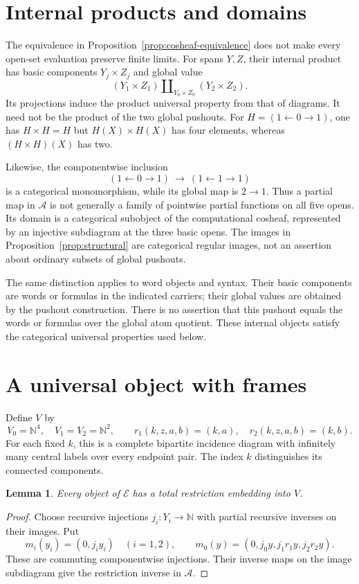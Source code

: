 \documentclass[11pt]{article}
\newtheorem{lemma}[theorem]{Lemma}
\newcommand{\N}{\mathbb N}
\newcommand{\E}{\mathscr E}
\newcommand{\A}{\mathscr A}
\begin{document}
\section{Internal products and domains}\label{sec:internal}

The equivalence in Proposition~\ref{prop:cosheaf-equivalence}
does not make every open-set evaluation preserve finite limits.
For spans $Y,Z$, their internal product has basic components
$Y_j\times Z_j$ and global value
\[
 (Y_1\times Z_1)
 \amalg_{Y_0\times Z_0}
 (Y_2\times Z_2).
\]
Its projections induce the product universal property from that
of diagrams. It need not be the product of the two global
pushouts. For $H=(1\leftarrow0\to1)$, one has $H\times H=H$
but $H(X)\times H(X)$ has four elements, whereas
$(H\times H)(X)$ has two.

Likewise, the componentwise inclusion
\[
 (1\leftarrow0\to1)\ \longrightarrow\ (1\leftarrow1\to1)
\]
is a categorical monomorphism, while its global map is $2\to1$.
Thus a partial map in $\A$ is not generally a family of
pointwise partial functions on all five opens. Its domain is a
categorical subobject of the computational cosheaf, represented
by an injective subdiagram at the three basic opens.
The images in Proposition~\ref{prop:structural} are categorical
regular images, not an assertion about ordinary subsets of global
pushouts.

The same distinction applies to word objects and syntax.
Their basic components are words or formulas in the indicated
carriers; their global values are obtained by the pushout
construction. There is no assertion that this pushout equals
the words or formulas over the global atom quotient.
These internal objects satisfy the categorical universal properties
used below.

\section{A universal object with frames}\label{sec:universal}

Define $V$ by
\[
 V_0=\N^4,\quad V_1=V_2=\N^2,\qquad
 r_1(k,z,a,b)=(k,a),\quad r_2(k,z,a,b)=(k,b).
\]
For each fixed $k$, this is a complete bipartite incidence diagram
with infinitely many central labels over every endpoint pair.
The index $k$ distinguishes its connected components.

\begin{lemma}\label{lem:dominance}
Every object of $\E$ has a total restriction embedding into $V$.
\end{lemma}
\begin{proof}
Choose recursive injections $j_i:Y_i\to\N$ with partial recursive
inverses on their images. Put
\[
 m_i(y_i)=(0,j_i y_i)\quad(i=1,2),\qquad
 m_0(y)=(0,j_0y,j_1r_1y,j_2r_2y).
\]
These are commuting componentwise injections. Their inverse
maps on the image subdiagram give the restriction inverse in $\A$.
\end{proof}
\end{document}
